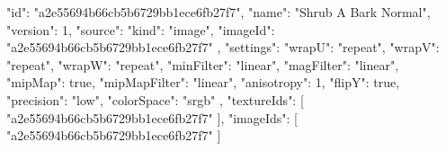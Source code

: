 {
  "id": "a2e55694b66cb5b6729bb1ece6fb27f7",
  "name": "Shrub A Bark Normal",
  "version": 1,
  "source": {
    "kind": "image",
    "imageId": "a2e55694b66cb5b6729bb1ece6fb27f7"
  },
  "settings": {
    "wrapU": "repeat",
    "wrapV": "repeat",
    "wrapW": "repeat",
    "minFilter": "linear",
    "magFilter": "linear",
    "mipMap": true,
    "mipMapFilter": "linear",
    "anisotropy": 1,
    "flipY": true,
    "precision": "low",
    "colorSpace": "srgb"
  },
  "textureIds": [
    "a2e55694b66cb5b6729bb1ece6fb27f7"
  ],
  "imageIds": [
    "a2e55694b66cb5b6729bb1ece6fb27f7"
  ]
}
